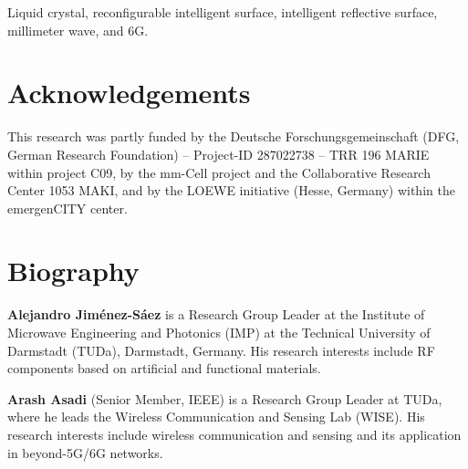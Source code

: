 \documentclass[journal]{IEEEtran}
\begin{document}
\begin{IEEEkeywords}
Liquid crystal, reconfigurable intelligent surface, intelligent reflective surface, millimeter wave, and 6G.
\end{IEEEkeywords}






%
\IEEEpeerreviewmaketitle






% 





\ifCLASSOPTIONcaptionsoff
  \newpage
\fi





\section{Acknowledgements}
This research was partly funded by the Deutsche Forschungsgemeinschaft (DFG, German Research Foundation) – Project-ID 287022738 – TRR 196 MARIE within project C09, by the mm-Cell project and the Collaborative Research Center 1053 MAKI, and by the LOEWE initiative (Hesse, Germany) within the emergenCITY center.

\section*{Biography}
\noindent 
\textbf{Alejandro Jim\'enez-S\'aez} is a Research Group Leader at the Institute of Microwave Engineering and Photonics (IMP) at the Technical University of Darmstadt (TUDa), Darmstadt, Germany. His research interests include RF components based on artificial and functional materials.

\vspace{0.3cm}
\noindent 
\textbf{Arash Asadi} (Senior Member, IEEE) is a Research Group Leader at TUDa, where he leads the Wireless Communication and Sensing Lab (WISE). His research interests include wireless communication and sensing and its application in beyond-5G/6G networks. %
\end{document}

